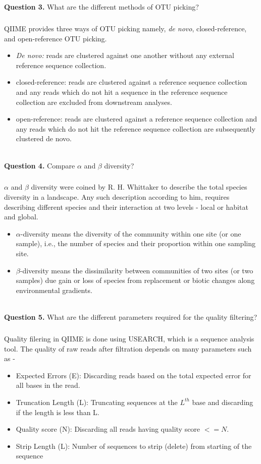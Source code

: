 \documentclass[12pt,a4paper]{report}
\begin{document}
\noindent
\textbf{Question 3.} What are the different methods of OTU picking?
\subparagraph{} QIIME provides three ways of OTU picking namely, \textit{de 
novo}, closed-reference, and open-reference OTU picking.
\begin{itemize}
    \item {\textit{De novo:} reads are clustered against one another without 
    any external reference sequence collection.}
    \item {closed-reference: reads are clustered against a reference sequence 
    collection and any reads which do not hit a sequence in the reference 
    sequence collection are excluded from downstream analyses.}
    \item {open-reference: reads are clustered against a reference sequence 
    collection and any reads which do not hit the reference sequence collection 
    are subsequently clustered de novo.}
\end{itemize}\mbox{}\\

\noindent
\textbf{Question 4.} Compare $\alpha$ and $\beta$ diversity?
\subparagraph{} $\alpha$ and $\beta$ diversity were coined by R. H. Whittaker 
to 
describe the total species diversity in a landscape. Any such description 
according to him, requires describing different species and their interaction 
at two levels - local or habitat and global.
\begin{itemize}
    \item {$\alpha$-diversity means the diversity of the community within one 
    site (or one sample), i.e., the number of species and their proportion 
    within one sampling site.}
    \item {$\beta$-diversity means the dissimilarity between communities of two
    sites (or two samples) due gain or loss of species from replacement or 
    biotic changes along environmental gradients.}
\end{itemize}\mbox{}\\

\noindent
\textbf{Question 5.} What are the different parameters required for the quality
filtering?
\subparagraph{} Quality filering in QIIME is done using USEARCH, which is a 
sequence analysis tool. The quality of raw reads after filtration depends on 
many parameters such as -

\begin{itemize}
    \item {Expected Errors (E): Discarding reads based on the total expected 
    error for all bases in the read.}
    \item {Truncation Length (L): Truncating sequences at the $L^{th}$ base 
    and 
    discarding if the length is less than L.}
    \item {Quality score (N): Discarding all reads having quality score $< = 
    N$.}
	\item {Strip Length (L): Number of sequences to strip (delete) from 
	starting of the sequence}
\end{itemize}\mbox{}\\
\end{document}
